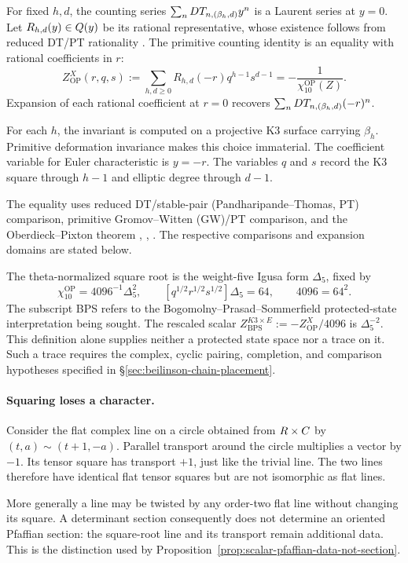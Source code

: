 For fixed \(h,d\), the counting series
\(\sum_nDT_{n,(\beta_h,d)}y^n\) is a Laurent series at
\(y=0\). Let \(R_{h,d}(y)\in Q(y)\) be its rational
representative, whose existence follows from reduced DT/PT
rationality \cite[Theorem 3]{OberdieckReducedPT}.
The primitive counting identity is an equality with rational
coefficients in \(r\):
\[
 Z^X_{\mathrm{OP}}(r,q,s):=
 \sum_{h,d\geq0}R_{h,d}(-r)q^{h-1}s^{d-1}
 =-\frac{1}{\chi_{10}^{\mathrm{OP}}(Z)}.
\]
Expansion of each rational coefficient at \(r=0\) recovers
\(\sum_nDT_{n,(\beta_h,d)}(-r)^n\).

For each \(h\), the invariant is computed on a projective K3 surface
carrying \(\beta_h\). Primitive deformation invariance makes this
choice immaterial. The coefficient variable for Euler characteristic is \(y=-r\).
The variables \(q\) and \(s\) record the K3 square through \(h-1\)
and elliptic degree through \(d-1\).

The equality uses reduced
DT/stable-pair (Pandharipande--Thomas, PT) comparison,
primitive Gromov--Witten (GW)/PT comparison, and the
Oberdieck--Pixton theorem \cite[Theorem 3(i)]{OberdieckReducedPT},
\cite[Proposition 5]{OPand}, \cite[Theorem 1]{OB}.
The respective comparisons and expansion domains are stated below.

The theta-normalized square root is the weight-five Igusa form
\(\Delta_5\), fixed by
\[
 \chi_{10}^{\mathrm{OP}}=4096^{-1}\Delta_5^2,
 \qquad [q^{1/2}r^{1/2}s^{1/2}]\Delta_5=64,
 \qquad 4096=64^2.
\]
The subscript BPS refers to the Bogomolny--Prasad--Sommerfield
protected-state interpretation being sought. The rescaled scalar
\(Z^{K3\times E}_{\mathrm{BPS}}:=-Z^X_{\mathrm{OP}}/4096\)
is \(\Delta_5^{-2}\). This definition alone supplies neither a
protected state space nor a trace on it. Such a trace requires the
complex, cyclic pairing, completion, and comparison hypotheses
specified in \S\ref{sec:beilinson-chain-placement}.

\paragraph*{Squaring loses a character.}
Consider the flat complex line on a circle obtained from
\(R\times C\) by \((t,a)\sim(t+1,-a)\).
Parallel transport around the circle multiplies a vector by \(-1\).
Its tensor square has transport \(+1\), just like the trivial line.
The two lines therefore have identical flat tensor squares but are
not isomorphic as flat lines.

More generally a line may be twisted
by any order-two flat line without changing its square.
A determinant section consequently does not determine an oriented
Pfaffian section: the square-root line and its transport remain
additional data. This is the distinction used by
Proposition~\ref{prop:scalar-pfaffian-data-not-section}.


